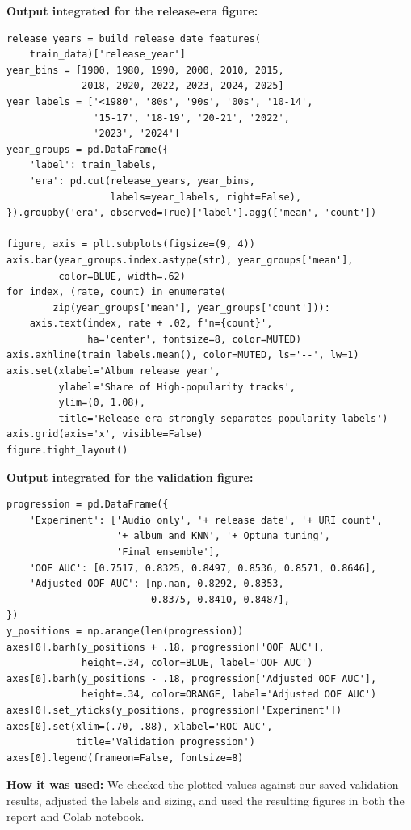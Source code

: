 \documentclass{article}
\begin{document}
\noindent\textbf{Output integrated for the release-era figure:}
\begin{lstlisting}[basicstyle=\ttfamily\scriptsize,breaklines=true]
release_years = build_release_date_features(
    train_data)['release_year']
year_bins = [1900, 1980, 1990, 2000, 2010, 2015,
             2018, 2020, 2022, 2023, 2024, 2025]
year_labels = ['<1980', '80s', '90s', '00s', '10-14',
               '15-17', '18-19', '20-21', '2022',
               '2023', '2024']
year_groups = pd.DataFrame({
    'label': train_labels,
    'era': pd.cut(release_years, year_bins,
                  labels=year_labels, right=False),
}).groupby('era', observed=True)['label'].agg(['mean', 'count'])

figure, axis = plt.subplots(figsize=(9, 4))
axis.bar(year_groups.index.astype(str), year_groups['mean'],
         color=BLUE, width=.62)
for index, (rate, count) in enumerate(
        zip(year_groups['mean'], year_groups['count'])):
    axis.text(index, rate + .02, f'n={count}',
              ha='center', fontsize=8, color=MUTED)
axis.axhline(train_labels.mean(), color=MUTED, ls='--', lw=1)
axis.set(xlabel='Album release year',
         ylabel='Share of High-popularity tracks',
         ylim=(0, 1.08),
         title='Release era strongly separates popularity labels')
axis.grid(axis='x', visible=False)
figure.tight_layout()
\end{lstlisting}

\noindent\textbf{Output integrated for the validation figure:}
\begin{lstlisting}[basicstyle=\ttfamily\scriptsize,breaklines=true]
progression = pd.DataFrame({
    'Experiment': ['Audio only', '+ release date', '+ URI count',
                   '+ album and KNN', '+ Optuna tuning',
                   'Final ensemble'],
    'OOF AUC': [0.7517, 0.8325, 0.8497, 0.8536, 0.8571, 0.8646],
    'Adjusted OOF AUC': [np.nan, 0.8292, 0.8353,
                         0.8375, 0.8410, 0.8487],
})
y_positions = np.arange(len(progression))
axes[0].barh(y_positions + .18, progression['OOF AUC'],
             height=.34, color=BLUE, label='OOF AUC')
axes[0].barh(y_positions - .18, progression['Adjusted OOF AUC'],
             height=.34, color=ORANGE, label='Adjusted OOF AUC')
axes[0].set_yticks(y_positions, progression['Experiment'])
axes[0].set(xlim=(.70, .88), xlabel='ROC AUC',
            title='Validation progression')
axes[0].legend(frameon=False, fontsize=8)
\end{lstlisting}

\noindent\textbf{How it was used:}
We checked the plotted values against our saved validation results, adjusted
the labels and sizing, and used the resulting figures in both the report and
Colab notebook.
\end{document}

